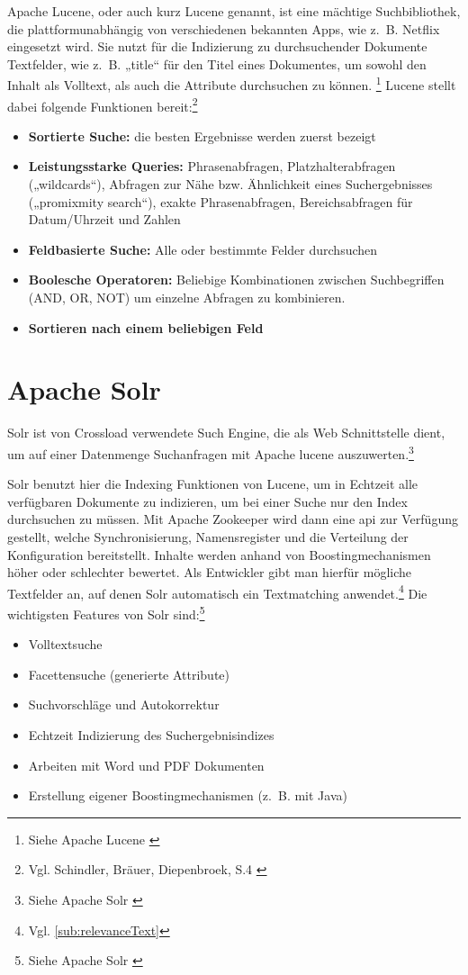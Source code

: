 Apache Lucene, oder auch kurz Lucene genannt, ist eine mächtige Suchbibliothek, die plattformunabhängig von verschiedenen bekannten Apps, wie z. B. Netflix eingesetzt wird.
Sie nutzt für die Indizierung zu durchsuchender Dokumente Textfelder, wie z. B. „title“ für den Titel eines Dokumentes, um sowohl den Inhalt als Volltext, als auch die Attribute durchsuchen zu können. \footnote{Siehe Apache Lucene \cite{lucene2022}}
Lucene stellt dabei folgende Funktionen bereit:\footnote{Vgl. Schindler, Bräuer, Diepenbroek, S.4 \cite{schindler2007}}
\begin{itemize}
  \item \textbf{Sortierte Suche:} die besten Ergebnisse werden zuerst bezeigt
  \item \textbf{Leistungsstarke Queries:} Phrasenabfragen, Platzhalterabfragen („wildcards“), Abfragen zur Nähe bzw. Ähnlichkeit eines Suchergebnisses („promixmity search“), exakte Phrasenabfragen, Bereichsabfragen für Datum/Uhrzeit und Zahlen
  \item \textbf{Feldbasierte Suche:} Alle oder bestimmte Felder durchsuchen
  \item \textbf{Boolesche Operatoren:} Beliebige Kombinationen zwischen Suchbegriffen (AND, OR,
  NOT) um einzelne Abfragen zu kombinieren.
  \item \textbf{Sortieren nach einem beliebigen Feld}
\end{itemize}

\section{Apache Solr}
\label{sec:Solr}
Solr ist von Crossload verwendete Such Engine, die als Web Schnittstelle dient, um auf einer Datenmenge Suchanfragen mit Apache \gls{lucene} auszuwerten.\footnote{Siehe Apache Solr \cite{solr2022}}

Solr benutzt hier die Indexing Funktionen von Lucene, um in Echtzeit alle verfügbaren Dokumente zu indizieren, um bei einer Suche nur den Index durchsuchen zu müssen.
Mit Apache Zookeeper wird dann eine \gls{api} zur Verfügung gestellt, welche Synchronisierung, Namensregister und die Verteilung der Konfiguration bereitstellt.
Inhalte werden anhand von Boostingmechanismen höher oder schlechter bewertet.
Als Entwickler gibt man hierfür mögliche Textfelder an, auf denen Solr automatisch ein Textmatching anwendet.\footnote{Vgl. \ref{sub:relevanceText}}
Die wichtigsten Features von Solr sind:\footnote{Siehe Apache Solr \cite{solr2022}}
\begin{itemize}
  \item Volltextsuche
  \item Facettensuche (generierte Attribute)
  \item Suchvorschläge und Autokorrektur
  \item Echtzeit Indizierung des Suchergebnisindizes
  \item Arbeiten mit Word und PDF Dokumenten
  \item Erstellung eigener Boostingmechanismen (z. B. mit Java)
\end{itemize}

